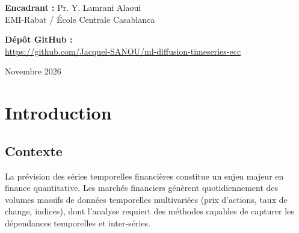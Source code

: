 \documentclass[12pt,a4paper]{article}
\begin{document}
\begin{center}
\vspace{0.8cm}

\begin{tcolorbox}[
  colback=eccgold!5,
  colframe=eccgold!70!black,
  width=10cm,
  arc=2mm,
  boxrule=0.6pt,
  halign=center,
]
\textbf{Encadrant :} Pr. Y. Lamrani Alaoui\\[2pt]
{\small EMI-Rabat / \'Ecole Centrale Casablanca}
\end{tcolorbox}

\vspace{0.6cm}

\begin{tcolorbox}[
  colback=gray!5,
  colframe=gray!40,
  width=10cm,
  arc=2mm,
  boxrule=0.5pt,
  halign=center,
]
\textbf{D\'ep\^ot GitHub :}\\[2pt]
\url{https://github.com/Jacquel-SANOU/ml-diffusion-timeseries-ecc}
\end{tcolorbox}

\vfill

\noindent\colorbox{eccblue}{%
  \parbox{\dimexpr\linewidth-2\fboxsep}{%
    \centering\vspace{8pt}
    {\color{white}\large Novembre 2026}
    \vspace{8pt}
  }%
}

\end{center}
\newpage

\setcounter{page}{2}
\tableofcontents
\clearpage

\section{Introduction}

\subsection{Contexte}

La pr\'evision des s\'eries temporelles financi\`eres constitue un enjeu majeur en finance quantitative. Les march\'es financiers g\'en\`erent quotidiennement des volumes massifs de donn\'ees temporelles multivari\'ees (prix d'actions, taux de change, indices), dont l'analyse requiert des m\'ethodes capables de capturer les d\'ependances temporelles et inter-s\'eries.
\end{document}

